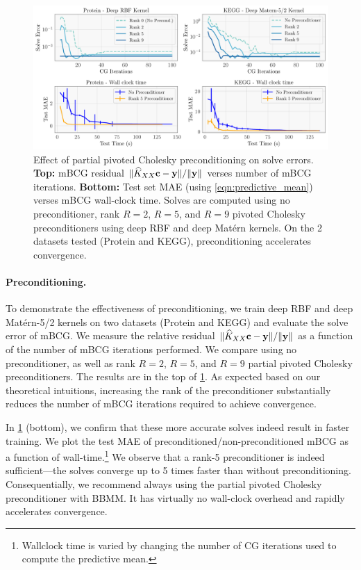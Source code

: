 \begin{figure}[t]
  \centering
  \includegraphics[width=\textwidth]{figures/precond_solves}
  \caption[Effect of partial pivoted Cholesky preconditioning on mBCG solve errors.]{
    Effect of partial pivoted Cholesky preconditioning on solve errors.
		{\bf Top:} mBCG residual $\Vert \widehat{K}_{XX} \mathbf{c} - \mathbf{y} \Vert / \Vert \mathbf{y} \Vert$ verses number of mBCG iterations.
		{\bf Bottom:} Test set MAE (using \cref{eqn:predictive_mean}) verses mBCG wall-clock time.
		Solves are computed using no preconditioner, rank $R=2$, $R=5$, and $R=9$ pivoted Cholesky preconditioners using deep RBF and deep Mat\'ern kernels.
		On the 2 datasets tested (Protein and KEGG), preconditioning accelerates convergence.
  }
  \label{fig:precond_results}
\end{figure}

\paragraph{Preconditioning.}
To demonstrate the effectiveness of preconditioning,
we train deep RBF and deep Mat\'ern-5/2 kernels on two datasets (Protein and KEGG) and evaluate the solve error of mBCG.
We measure the relative residual $\Vert \widehat{K}_{XX}\mathbf{c} - \mathbf{y} \Vert / \Vert \mathbf{y} \Vert$ as a function of the number of mBCG iterations performed.
We compare using no preconditioner, as well as rank $R=2$, $R=5$, and $R=9$ partial pivoted Cholesky preconditioners.
The results are in the top of \cref{fig:precond_results}.
As expected based on our theoretical intuitions, increasing the rank of the preconditioner substantially reduces the number of mBCG iterations required to achieve convergence.

In \cref{fig:precond_results} (bottom), we confirm that these more accurate solves indeed result in faster training.
We plot the test MAE of preconditioned/non-preconditioned mBCG as a function of wall-time.\footnote{
  Wallclock time is varied by changing the number of CG iterations used to compute the predictive mean.
}
We observe that a rank-5 preconditioner is indeed sufficient---the solves converge up to 5 times faster than without preconditioning.
Consequentially, we recommend always using the partial pivoted Cholesky preconditioner with BBMM.
It has virtually no wall-clock overhead and rapidly accelerates convergence.
